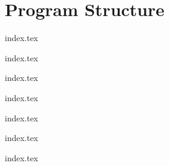 
\chapter{Program Structure}
{
	\lipsum[1]
	
	{index.tex}
	
	{index.tex}
	
	{index.tex}
	
	{index.tex}
	
	{index.tex}
	
	{index.tex}
	
	{index.tex}
}

